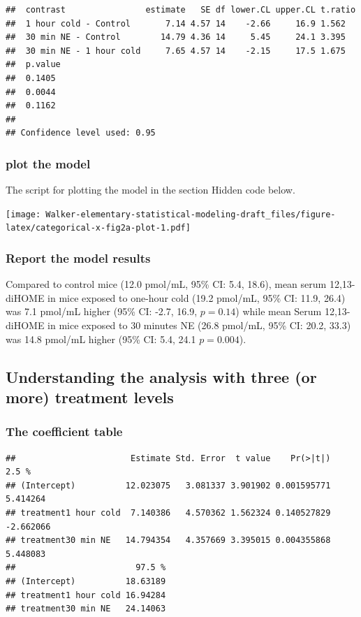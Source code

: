 \documentclass[]{book}
\begin{document}
\begin{verbatim}
##  contrast                estimate   SE df lower.CL upper.CL t.ratio
##  1 hour cold - Control       7.14 4.57 14    -2.66     16.9 1.562  
##  30 min NE - Control        14.79 4.36 14     5.45     24.1 3.395  
##  30 min NE - 1 hour cold     7.65 4.57 14    -2.15     17.5 1.675  
##  p.value
##  0.1405 
##  0.0044 
##  0.1162 
## 
## Confidence level used: 0.95
\end{verbatim}

\hypertarget{plot-the-model}{%
\subsubsection{plot the model}\label{plot-the-model}}

The script for plotting the model in the section Hidden code below.

\texttt{[image: Walker-elementary-statistical-modeling-draft\_files/figure-latex/categorical-x-fig2a-plot-1.pdf]}

\hypertarget{report-the-model-results}{%
\subsubsection{Report the model results}\label{report-the-model-results}}

Compared to control mice (12.0 pmol/mL, 95\% CI: 5.4, 18.6), mean serum 12,13-diHOME in mice exposed to one-hour cold (19.2 pmol/mL, 95\% CI: 11.9, 26.4) was 7.1 pmol/mL higher (95\% CI: -2.7, 16.9, \(p = 0.14\)) while mean Serum 12,13-diHOME in mice exposed to 30 minutes NE (26.8 pmol/mL, 95\% CI: 20.2, 33.3) was 14.8 pmol/mL higher (95\% CI: 5.4, 24.1 \(p = 0.004\)).

\hypertarget{understanding-the-analysis-with-three-or-more-treatment-levels}{%
\subsection{Understanding the analysis with three (or more) treatment levels}\label{understanding-the-analysis-with-three-or-more-treatment-levels}}

\hypertarget{the-coefficient-table}{%
\subsubsection{The coefficient table}\label{the-coefficient-table}}

\begin{verbatim}
##                       Estimate Std. Error  t value    Pr(>|t|)     2.5 %
## (Intercept)          12.023075   3.081337 3.901902 0.001595771  5.414264
## treatment1 hour cold  7.140386   4.570362 1.562324 0.140527829 -2.662066
## treatment30 min NE   14.794354   4.357669 3.395015 0.004355868  5.448083
##                        97.5 %
## (Intercept)          18.63189
## treatment1 hour cold 16.94284
## treatment30 min NE   24.14063
\end{verbatim}
\end{document}
